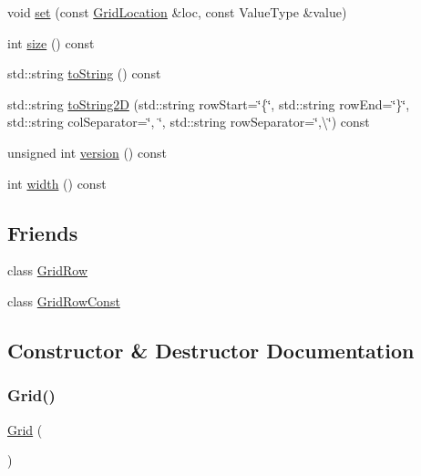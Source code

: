 \begin{DoxyCompactItemize}
\item 
void \mbox{\hyperlink{classGrid_a02a61287a9aee6a1ff7e8a8325ce094d}{set}} (const \mbox{\hyperlink{structGridLocation}{Grid\+Location}} \&loc, const Value\+Type \&value)
\item 
int \mbox{\hyperlink{classGrid_af9593d4a5ff4274efaf429cb4f9e57cc}{size}} () const
\item 
std\+::string \mbox{\hyperlink{classGrid_a1fe5121d6528fdea3f243321b3fa3a49}{to\+String}} () const
\item 
std\+::string \mbox{\hyperlink{classGrid_a8e636ad8b56218c7e0162d6c1bd78b39}{to\+String2D}} (std\+::string row\+Start=\char`\"{}\{\char`\"{}, std\+::string row\+End=\char`\"{}\}\char`\"{}, std\+::string col\+Separator=\char`\"{}, \char`\"{}, std\+::string row\+Separator=\char`\"{},\textbackslash{}\char`\"{}) const
\item 
unsigned int \mbox{\hyperlink{classGrid_a0aa696ccb72cbf928535d6b646bac1aa}{version}} () const
\item 
int \mbox{\hyperlink{classGrid_ad72663daf610f2a0833a2fc3d78e4fdf}{width}} () const
\end{DoxyCompactItemize}
\subsection*{Friends}
\begin{DoxyCompactItemize}
\item 
class \mbox{\hyperlink{classGrid_a20059dcdf5d8836488337c056079f5e2}{Grid\+Row}}
\item 
class \mbox{\hyperlink{classGrid_aba3ef1df6ffede859468bdcab36ab6d6}{Grid\+Row\+Const}}
\end{DoxyCompactItemize}


\subsection{Constructor \& Destructor Documentation}
\mbox{\label{classGrid_a0a335d0339fe70071fcdf4cd5b1c7b5f}} 
\subsubsection{\texorpdfstring{Grid()}{Grid()}\hspace{0.1cm}{\footnotesize\ttfamily [1/5]}}
{\footnotesize\ttfamily \mbox{\hyperlink{classGrid}{Grid}} (\begin{DoxyParamCaption}{ }\end{DoxyParamCaption})}


